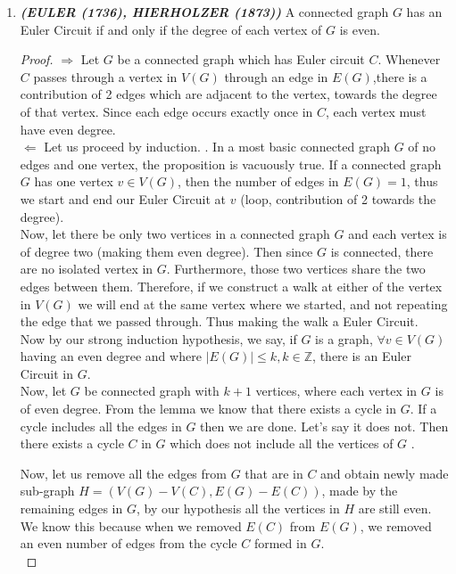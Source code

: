 \documentclass[12pt, fullpage]{article}
\newcommand{\Z}{\mathbb Z}
\begin{document}
\begin{enumerate}
	\item \textit{\textbf{(EULER (1736), HIERHOLZER (1873))}} A connected graph $G$ has an Euler Circuit if and only if the degree of each vertex of $G$ is even.
\begin{proof}
 	$\Longrightarrow$ Let $G$ be a connected graph which has Euler circuit $C$. Whenever $C$ passes through a vertex in $V(G)$ through an edge in $E(G)$,there is a contribution of 2 edges which are adjacent to the vertex, towards the degree of that vertex. Since each edge occurs exactly once in $C$, each vertex must have even degree. \\
 	
 	$\Longleftarrow$ Let us proceed by induction. . In a most basic connected graph $G$ of no edges and one vertex, the proposition is vacuously true. If a connected graph $G$ has one vertex $v \in V(G)$, then the number of edges in $E(G) = 1$, thus we start and end our Euler Circuit at $v$ (loop, contribution of 2 towards the degree). \\
 	
 	Now, let there be only two vertices in a connected graph $G$ and each vertex is of degree two (making them even degree). Then since $G$ is connected, there are no isolated vertex in $G$. Furthermore, those two vertices share the two edges between them. Therefore, if we construct a walk at either of the vertex in $V(G)$ we will end at the same vertex where we started, and not repeating the edge that we passed through. Thus making the walk a Euler Circuit.\\ 
 	
 	Now by our strong induction hypothesis, we say, if $G$ is a graph, $\forall v \in V(G)$ having an even degree and where $\vert E(G)\vert \leq k, k \in \Z$, there is an Euler Circuit in $G$.\\
 	
 	 Now, let $G$ be connected graph with $k+1$ vertices, where each vertex in $G$ is of even degree. From the lemma we know that there exists a cycle in $G$. If a cycle includes all the edges in $G$ then we are done. Let's say it does not. Then there exists a cycle $C$ in $G$ which does not include all the vertices of $G$ . 
 	 
 	 Now, let us remove all the edges from $G$ that are in $C$ and obtain newly made sub-graph $H = (V(G) - V(C) , E(G)-E(C))$, made by the remaining edges in $G$, by our hypothesis all the vertices in $H$ are still even. We know this because when we removed $E(C)$ from $E(G)$, we removed an even number of edges from the cycle $C$ formed in $G$.\\
 	 

\end{proof}
\end{enumerate}
\end{document}

